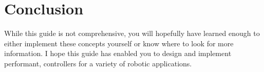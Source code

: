 \chapter{Conclusion}

While this guide is not comprehensive, you will hopefully have learned enough to
either implement these concepts yourself or know where to look for more
information. I hope this guide has enabled you to design and implement
performant,  controllers for a variety of robotic
applications.
